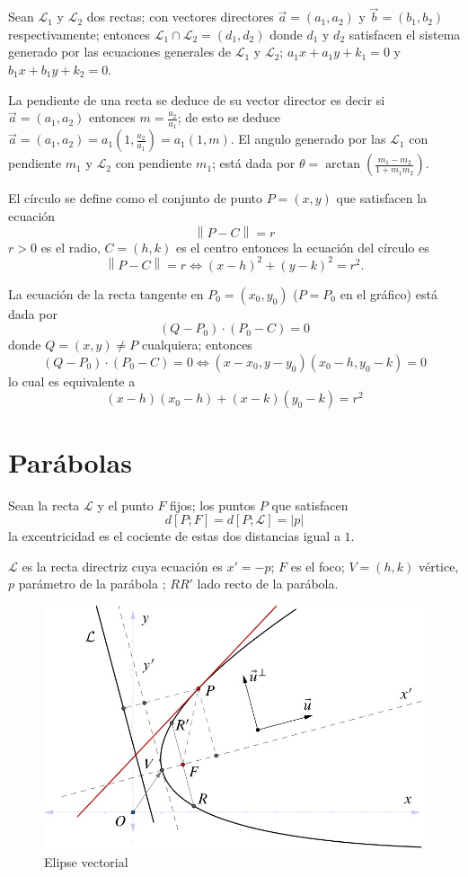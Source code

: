 \documentclass[12pt,]{report}
\theoremstyle{definition}
\theoremstyle{definition}
\theoremstyle{definition}
\theoremstyle{remark}
\begin{document}
Sean \(\mathcal{L}_1\) y \(\mathcal{L}_2\) dos rectas; con vectores directores \(\vec{a}=(a_1,a_2)\) y \(\vec{b}=(b_1,b_2)\) respectivamente; entonces \(\mathcal{L}_1\cap\mathcal{L}_2=(d_1,d_2)\) donde \(d_1\) y \(d_2\) satisfacen el sistema generado por las ecuaciones generales de \(\mathcal{L}_1\) y \(\mathcal{L}_2\); \(a_1x+a_1y+k_1=0\) y \(b_1x+b_1y+k_2=0\).

La pendiente de una recta se deduce de su vector director es decir si \(\vec{a}=(a_1,a_2)\) entonces \(m=\frac{a_2}{a_1}\); de esto se deduce \(\vec{a}=(a_1,a_2)=a_1(1,\frac{a_2}{a_1})=a_1(1,m)\). El angulo generado por las \(\mathcal{L}_1\) con pendiente \(m_1\) y \(\mathcal{L}_2\) con pendiente \(m_1\); está dada por \(\theta=\arctan\left(\frac{m_1-m_2}{1+m_1m_2}\right)\).

El círculo se define como el conjunto de punto \(P=(x,y)\) que satisfacen la ecuación \[\left \|P-C\right\|=r\] \(r>0\) es el radio, \(C=(h,k)\) es el centro entonces la ecuación del círculo es \[\left \|P-C\right\|=r\iff (x-h)^2+(y-k)^2=r^2.\]

La ecuación de la recta tangente en \(P_0=(x_0,y_0)\) (\(P=P_0\) en el gráfico) está dada por \[(Q-P_0)\cdot(P_0-C)=0\] donde \(Q=(x,y)\neq P\) cualquiera; entonces \[(Q-P_0)\cdot(P_0-C)=0\iff  (x-x_0,y-y_0)(x_0-h,y_0-k)=0\] lo cual es equivalente a \[(x-h)(x_0-h)+(x-k)(y_0-k)=r^2\]

\hypertarget{paruxe1bolas}{%
\chapter{Parábolas}\label{paruxe1bolas}}

Sean la recta \(\mathcal{L}\) y el punto \(F\) fijos; los puntos \(P\) que satisfacen \[d\left[P;F\right]=d\left[P;\mathcal{L}\right]=\left|p\right|\] la excentricidad es el cociente de estas dos distancias igual a \(1\).

\(\mathcal{L}\) es la recta directriz cuya ecuación es \(x'=-p\); \(F\) es el foco; \(V=(h,k)\) vértice, \(p\) parámetro de la parábola ; \(RR'\) lado recto de la parábola.

\begin{figure}

{\centering \includegraphics{parabola} 

}

\caption{Elipse vectorial}\label{fig:hiperbola1}
\end{figure}
\end{document}
